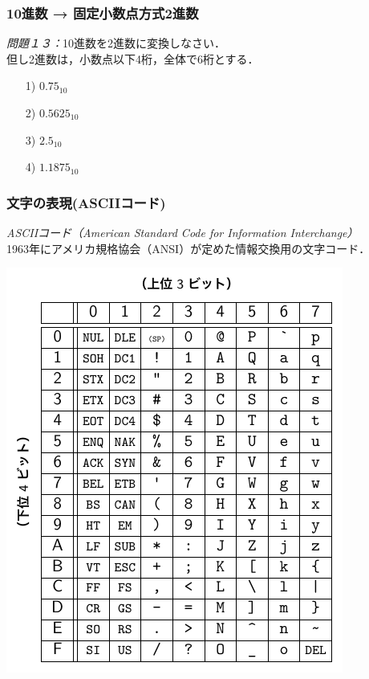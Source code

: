 \documentclass[handout]{beamer}        %
\begin{document}
\begin{frame}
  \frametitle{10進数 → 固定小数点方式2進数}
  \emph{問題１３：}10進数を2進数に変換しなさい．\\
       但し2進数は，小数点以下4桁，全体で6桁とする．
       \vfill
  \begin{enumerate}
  \item[1)] $0.75_{10}$
  \vfill
  \item[2)] $0.5625_{10}$
  \vfill
  \item[3)] $2.5_{10}$
  \vfill
  \item[4)] $1.1875_{10}$
  \end{enumerate}
\end{frame}

\begin{frame}
  \frametitle{文字の表現(ASCIIコード)}
  \emph{ASCIIコード（American Standard Code for Information Interchange）}\\
  1963年にアメリカ規格協会（ANSI）が定めた情報交換用の文字コード．

  \centerline{\includegraphics[scale=0.80]{../Tikz/ascii.pdf}}

\end{frame}
\end{document}
